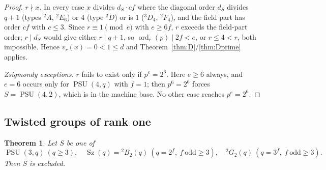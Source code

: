 \documentclass[11pt]{amsart}
\newtheorem{theorem}{Theorem}[section]
\theoremstyle{definition}
\theoremstyle{remark}
\DeclareMathOperator{\PSU}{PSU}
\DeclareMathOperator{\Sz}{Sz}
\DeclareMathOperator{\ord}{ord}
\newcommand{\vp}[1]{v_{#1}}
\begin{document}
\begin{proof}
\emph{$r\nmid x$.} In every case $x$ divides $d_S\cdot c f$ where the
diagonal order $d_S$ divides $q+1$ (types ${}^2A$, ${}^2E_6$) or $4$
(type ${}^2D$) or is $1$ (${}^3D_4$, ${}^2F_4$), and the field part has
order $cf$ with $c\leq3$. Since $r\equiv1\pmod e$ with $e\geq6f$, $r$
exceeds the field-part order; $r\mid d_S$ would give either $r\mid q+1$,
so $\ord_r(p)\mid2f<e$, or $r\leq4<r$, both impossible. Hence
$\vp{r}(x)=0<1\leq d$ and Theorem~\ref{thm:D}/\ref{thm:Dprime} applies.

\emph{Zsigmondy exceptions.} $r$ fails to exist only if $p^e=2^6$. Here
$e\geq6$ always, and $e=6$ occurs only for $\PSU(4,q)$ with $f=1$; then
$p^6=2^6$ forces $S=\PSU(4,2)$, which is in the machine base. No other
case reaches $p^e=2^6$.
\end{proof}

\subsection{Twisted groups of rank one}

\begin{theorem}\label{thm:twisted1}
Let $S$ be one of
\[
\PSU(3,q)\ (q\geq3),\quad
\Sz(q)={}^2B_2(q)\ (q=2^f,\ f\ \text{odd}\geq3),\quad
{}^2G_2(q)\ (q=3^f,\ f\ \text{odd}\geq3).
\]
Then $S$ is excluded.
\end{theorem}
\end{document}
